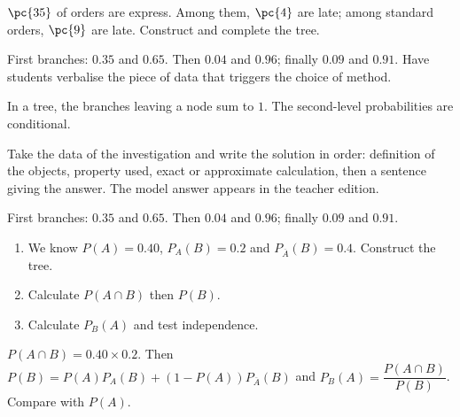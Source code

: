     \begin{activity}
    $\pc{35}$ of orders are express. Among them, $\pc{4}$ are late; among standard orders, $\pc{9}$ are late. Construct and complete the tree.
    \begin{center}\end{center}
    \end{activity}
    \begin{solution}First branches: $\num{0,35}$ and $\num{0,65}$. Then $\num{0,04}$ and $\num{0,96}$; finally $\num{0,09}$ and $\num{0,91}$. Have students verbalise the piece of data that triggers the choice of method.\end{solution}

    \begin{summary}In a tree, the branches leaving a node sum to $1$. The second-level probabilities are conditional.\end{summary}

    \begin{example}
    Take the data of the investigation and write the solution in order: definition of the objects, property used, exact or approximate calculation, then a sentence giving the answer. The model answer appears in the teacher edition.
    \end{example}
    \begin{solution}First branches: $\num{0,35}$ and $\num{0,65}$. Then $\num{0,04}$ and $\num{0,96}$; finally $\num{0,09}$ and $\num{0,91}$.\end{solution}

    \begin{exercise}[essential]
    \begin{enumerate}\item We know $P(A)=\num{0,40}$, $P_A(B)=\num{0,2}$ and $P_{\overline A}(B)=\num{0,4}$. Construct the tree.\item Calculate $P(A\cap B)$ then $P(B)$.\item Calculate $P_B(A)$ and test independence.\end{enumerate}
    \end{exercise}
    \begin{solution}$P(A\cap B)=\num{0,40}\times\num{0,2}$. Then $P(B)=P(A)P_A(B)+(1-P(A))P_{\overline A}(B)$ and $P_B(A)=\dfrac{P(A\cap B)}{P(B)}$. Compare with $P(A)$.\end{solution}

